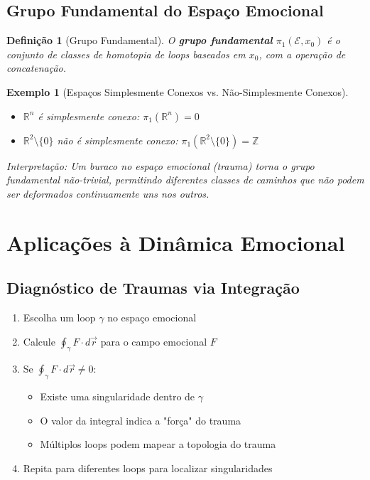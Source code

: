 \documentclass[12pt, a4paper]{article}
\newtheorem{definition}{Definição}
\newtheorem{example}{Exemplo}
\begin{document}
\subsection{Grupo Fundamental do Espaço Emocional}

\begin{definition}[Grupo Fundamental]
O \textbf{grupo fundamental} $\pi_1(\mathcal{E}, x_0)$ é o conjunto de classes de homotopia de loops baseados em $x_0$, com a operação de concatenação.
\end{definition}

\begin{example}[Espaços Simplesmente Conexos vs. Não-Simplesmente Conexos]
\begin{itemize}
\item $\mathbb{R}^n$ é simplesmente conexo: $\pi_1(\mathbb{R}^n) = 0$
\item $\mathbb{R}^2 \setminus \{0\}$ não é simplesmente conexo: $\pi_1(\mathbb{R}^2 \setminus \{0\}) = \mathbb{Z}$
\end{itemize}
Interpretação: Um buraco no espaço emocional (trauma) torna o grupo fundamental não-trivial, permitindo diferentes classes de caminhos que não podem ser deformados continuamente uns nos outros.
\end{example}

\section{Aplicações à Dinâmica Emocional}

\subsection{Diagnóstico de Traumas via Integração}

\begin{algorithm}[H]
\caption{Detecção de Singularidades Traumáticas}
\begin{enumerate}
\item Escolha um loop $\gamma$ no espaço emocional
\item Calcule $\oint_\gamma F \cdot d\vec{r}$ para o campo emocional $F$
\item Se $\oint_\gamma F \cdot d\vec{r} \neq 0$:
   \begin{itemize}
   \item Existe uma singularidade dentro de $\gamma$
   \item O valor da integral indica a "força" do trauma
   \item Múltiplos loops podem mapear a topologia do trauma
   \end{itemize}
\item Repita para diferentes loops para localizar singularidades
\end{enumerate}
\end{algorithm}
\end{document}
